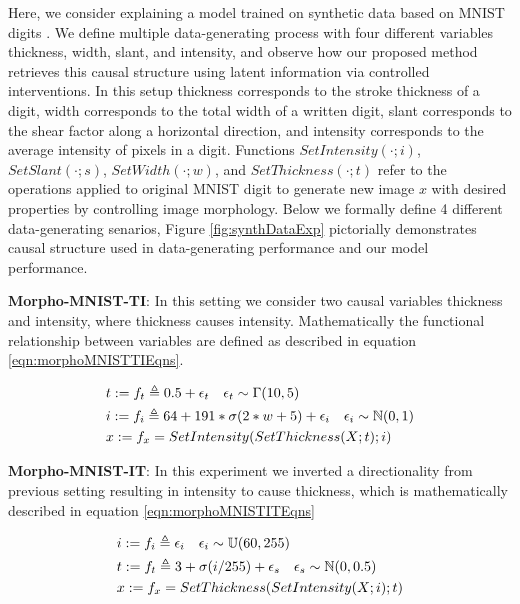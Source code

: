 \documentclass{article}
\begin{document}
Here, we consider explaining a model trained on synthetic data based on MNIST digits \cite{castro2019morpho}. 
We define multiple data-generating process with four different variables thickness, width, slant, and intensity, and observe how our proposed method retrieves this causal structure using latent information via controlled interventions.
In this setup thickness corresponds to the stroke thickness of a digit, width corresponds to the total width of a written digit, slant corresponds to the shear factor along a horizontal direction, and intensity corresponds to the average intensity of pixels in a digit.
Functions $SetIntensity( · ; i)$, $SetSlant( · ; s)$, $SetWidth( · ; w)$, and $SetThickness( · ; t)$ refer to the operations applied to original MNIST digit to generate new image $x$ with desired properties by controlling image morphology.
Below we formally define 4 different data-generating senarios, Figure \ref{fig:synthDataExp} pictorially demonstrates causal structure used in data-generating performance and our model performance.

\textbf{Morpho-MNIST-TI}: In this setting we consider two causal variables thickness and intensity, where thickness causes intensity. 
Mathematically the functional relationship between variables are defined as described in equation \ref{eqn:morphoMNISTTIEqns}.

\begin{equation}
    \begin{aligned}
        &t := f_t \triangleq 0.5 + \epsilon_t \quad \epsilon_t \sim \Gamma(10, 5) \\
        &i := f_i \triangleq 64 + 191*\sigma(2*w + 5) + \epsilon_i \quad \epsilon_i \sim \mathbb{N}(0, 1)\\
        &x := f_x = SetIntensity(SetThickness(X; t); i)
    \end{aligned}
    \label{eqn:morphoMNISTTIEqns}
    \centering
\end{equation}

\textbf{Morpho-MNIST-IT}: In this experiment we inverted a directionality from previous setting resulting in intensity to cause thickness, which is mathematically described in equation \ref{eqn:morphoMNISTITEqns}

\begin{equation}
    \begin{aligned}
        &i := f_i \triangleq \epsilon_i \quad \epsilon_i \sim \mathbb{U}(60, 255)\\
        &t := f_t \triangleq 3 + \sigma(i/255) + \epsilon_s \quad \epsilon_s \sim \mathbb{N}(0, 0.5)\\
        &x := f_x = SetThickness(SetIntensity(X; i); t)
    \end{aligned}
    \label{eqn:morphoMNISTITEqns}
    \centering
\end{equation}
\end{document}
